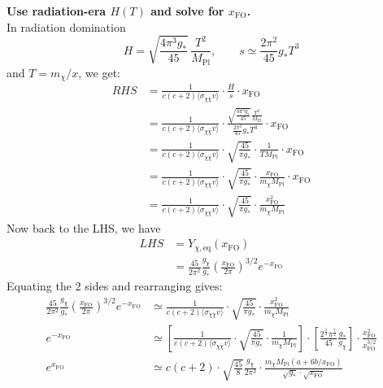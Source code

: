 \begin{foundation}
    \textbf{Use radiation-era $H(T)$ and solve for $x_{\mathrm{FO}}$.}\\
    In radiation domination
    \[
        H=\sqrt{\frac{4\pi^3g_*}{45}}\,\frac{T^2}{M_{\text{Pl}}},\qquad s\simeq\frac{2\pi^2}{45}g_*T^3
    \]
    and $T=m_\chi/x$, we get:
    \begin{align*}
        RHS &= \frac{1}{c(c+2) \langle\sigma_{\chi\bar\chi}v\rangle} \cdot \frac{H}{s} \cdot x_{\mathrm{FO}} \\
        &= \frac{1}{c(c+2) \langle\sigma_{\chi\bar\chi}v\rangle} \cdot \frac{\sqrt{\frac{4\pi^3 g_*}{45}} \frac{T^2}{M_{\text{Pl}}}}{\frac{2\pi^2}{45} g_* T^3} \cdot x_{\mathrm{FO}} \\
        &= \frac{1}{c(c+2) \langle\sigma_{\chi\bar\chi}v\rangle} \cdot \sqrt{\frac{45}{\pi g_*}} \cdot \frac{1}{ T M_{\text{Pl}} } \cdot x_{\mathrm{FO}} \\
        &= \frac{1}{c(c+2) \langle\sigma_{\chi\bar\chi}v\rangle} \cdot \sqrt{\frac{45}{\pi g_*}} \cdot \frac{x_{\mathrm{FO}}}{ m_\chi M_{\text{Pl}} } \cdot x_{\mathrm{FO}} \\
        &= \frac{1}{c(c+2) \langle\sigma_{\chi\bar\chi}v\rangle} \cdot \sqrt{\frac{45}{\pi g_*}} \cdot \frac{x_{\mathrm{FO}}^2}{ m_\chi M_{\text{Pl}} }
    \end{align*}
    Now back to the LHS, we have
    \begin{align*}
        LHS &= Y_{\chi,\mathrm{eq}}(x_{\mathrm{FO}}) \\
        &= \frac{45}{2\pi^2} \frac{g_\chi}{g_*} \left( \frac{x_{\mathrm{FO}}}{2\pi} \right)^{3/2} e^{-x_{\mathrm{FO}}}
    \end{align*}
    Equating the 2 sides and rearranging gives:
    \small
    \begin{align*}
        \frac{45}{2\pi^2} \frac{g_\chi}{g_*} \left( \frac{x_{\mathrm{FO}}}{2\pi} \right)^{3/2} e^{-x_{\mathrm{FO}}} &\simeq \frac{1}{c(c+2) \langle\sigma_{\chi\bar\chi}v\rangle} \cdot \sqrt{\frac{45}{\pi g_*}} \cdot \frac{x_{\mathrm{FO}}^2}{ m_\chi M_{\text{Pl}} } \\
        e^{-x_{\mathrm{FO}}} &\simeq \left[ \frac{1}{c(c+2) \langle\sigma_{\chi\bar\chi}v\rangle} \cdot \sqrt{\frac{45}{\pi g_*}} \cdot \frac{1}{m_\chi M_{\text{Pl}}} \right] \cdot \left[ \frac{2^{\frac{5}{2}}\pi^{\frac{7}{2}}}{45} \frac{g_*}{g_\chi} \right] \cdot \frac{x_{\mathrm{FO}}^2}{x_{\mathrm{FO}}^{3/2}} \\
        e^{x_{\mathrm{FO}}} &\simeq c(c+2) \cdot \sqrt{\frac{45}{8}} \frac{g_\chi}{2 \pi^3} \cdot \frac{m_\chi M_{\text{Pl}} \left( a + 6b / x_{\mathrm{FO}}  \right)}{\sqrt{g_*} \cdot \sqrt{x_{\mathrm{FO}}}}
    \end{align*}
    \normalsize
\end{foundation}

